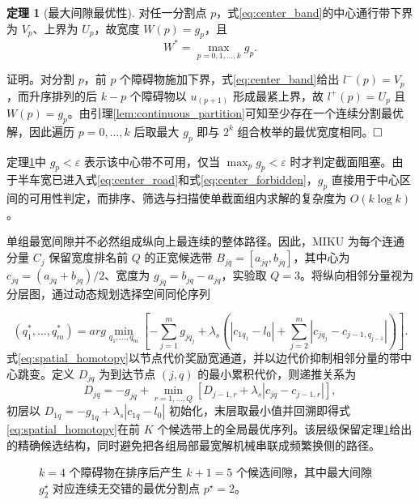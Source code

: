 \documentclass[a4paper,zihao=5]{ctexart}
\theoremstyle{definition}
\newtheorem{theorem}{定理}[section]
\begin{document}
\begin{theorem}[最大间隙最优性]
\label{thm:max_gap}
对任一分割点 $p$，式\eqref{eq:center_band}的中心通行带下界为 $V_p$、上界为 $U_p$，故宽度 $W(p)=g_p$，且
\begin{equation}
    W^{*} = \max_{p = 0, 1, \ldots, k} g_p.
    \label{eq:max_gap_opt}
\end{equation}
\end{theorem}

证明。对分割 $p$，前 $p$ 个障碍物施加下界，式\eqref{eq:center_band}给出 $l^-(p)=V_p$，而升序排列的后 $k-p$ 个障碍物以 $u_{(p+1)}$ 形成最紧上界，故 $l^+(p)=U_p$ 且 $W(p)=g_p$。由引理\ref{lem:continuous_partition}可知至少存在一个连续分割最优解，因此遍历 $p=0,\ldots,k$ 后取最大 $g_p$ 即与 $2^k$ 组合枚举的最优宽度相同。$\hfill\Box$

定理\ref{thm:max_gap}中 $g_p<\varepsilon$ 表示该中心带不可用，仅当 $\max_p g_p<\varepsilon$ 时才判定截面阻塞。由于半车宽已进入式\eqref{eq:center_road}和式\eqref{eq:center_forbidden}，$g_p$ 直接用于中心区间的可用性判定，而排序、筛选与扫描使单截面组内求解的复杂度为 $O(k\log k)$。

单组最宽间隙并不必然组成纵向上最连续的整体路径。因此，MIKU 为每个连通分量 $C_j$ 保留宽度排名前 $Q$ 的正宽候选带 $B_{jq}=[a_{jq},b_{jq}]$，其中心为 $c_{jq}=(a_{jq}+b_{jq})/2$、宽度为 $g_{jq}=b_{jq}-a_{jq}$，实验取 $Q=3$。将纵向相邻分量视为分层图，通过动态规划选择空间同伦序列

\begin{equation}
 (q_1^*,\ldots,q_m^*)=arg\min_{q_1,\ldots,q_m}
 \left[-\sum_{j=1}^{m}g_{jq_j}
 +\lambda_s\left(|c_{1q_1}-l_0|+
 \sum_{j=2}^{m}|c_{jq_j}-c_{j-1,q_{j-1}}|\right)\right].
 \label{eq:spatial_homotopy}
\end{equation}
式\eqref{eq:spatial_homotopy}以节点代价奖励宽通道，并以边代价抑制相邻分量的带中心跳变。定义 $D_{jq}$ 为到达节点 $(j,q)$ 的最小累积代价，则递推关系为
\begin{equation}
 D_{jq}=-g_{jq}+\min_{r=1,\ldots,Q}
 \left[D_{j-1,r}+\lambda_s|c_{jq}-c_{j-1,r}|\right],
 \label{eq:spatial_dp}
\end{equation}
初层以 $D_{1q}=-g_{1q}+\lambda_s|c_{1q}-l_0|$ 初始化，末层取最小值并回溯即得式\eqref{eq:spatial_homotopy}在前 $K$ 个候选带上的全局最优序列。该层级保留定理\ref{thm:max_gap}给出的精确候选结构，同时避免把各组局部最宽解机械串联成频繁换侧的路径。

\begin{figure}[htbp]
\centering
{}
\caption{按 $u_i$ 排序后的候选间隙与最优连续分割}
\caption*{$k{=}4$ 个障碍物在排序后产生 $k{+}1{=}5$ 个候选间隙，其中最大间隙 $g_2^{\star}$ 对应连续无交错的最优分割点 $p^{\star}{=}2$。}
\label{fig:max_gap}
\end{figure}
\end{document}
